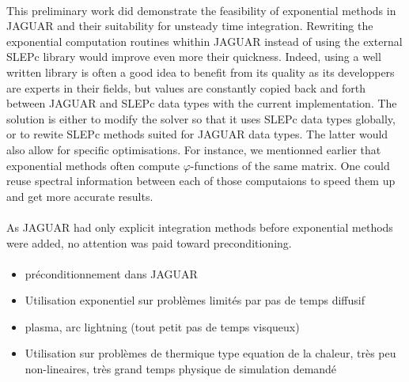     \paragraph{}
    This preliminary work did demonstrate the feasibility of exponential methods in JAGUAR and their suitability for unsteady time integration.
    Rewriting the exponential computation routines whithin JAGUAR instead of using the external SLEPc library would improve even more their quickness.
    Indeed, using a well written library is often a good idea to benefit from its quality as its developpers are experts in their fields, but values are constantly copied back and forth between JAGUAR and SLEPc data types with the current implementation.
    The solution is either to modify the solver so that it uses SLEPc data types globally, or to rewite SLEPc methods suited for JAGUAR data types.
    The latter would also allow for specific optimisations.
    For instance, we mentionned earlier that exponential methods often compute $\varphi$-functions of the same matrix.
    One could reuse spectral information between each of those computaions to speed them up and get more accurate results.

    \paragraph{}
    As JAGUAR had only explicit integration methods before exponential methods were added, no attention was paid toward preconditioning.
    

    \paragraph{}
    \begin{itemize}
      \item préconditionnement dans JAGUAR
      \item Utilisation exponentiel sur problèmes limités par pas de temps diffusif
      \item plasma, arc lightning (tout petit pas de temps visqueux)
      \item Utilisation sur problèmes de thermique type equation de la chaleur, très peu non-lineaires, très grand temps physique de simulation demandé
    \end{itemize}
